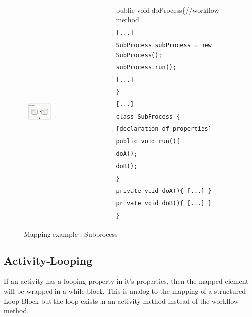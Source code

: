 \begin{figure}[h]
\centering
\begin{tabularx}{\linewidth}{lcX}
	\multirow{16}{*}{\includegraphics[width=0.35\textwidth]{images/mapping/subprocess.png}} &  &public void doProcess\{//workflow-method\\
	& & \texttt{\hspace{10pt}[...]}\\
	& & \texttt{\hspace{10pt}SubProcess subProcess = new SubProcess();}\\
	& & \texttt{\hspace{10pt}subProcess.run();}\\
	& & \texttt{\hspace{10pt}[...]}\\
	& & \texttt{\}}\\
	& & \texttt{[...]}\\
	& \textbf{\textcolor{blue}{=}} & \texttt{class SubProcess \{}\\
	& & \texttt{\hspace{10pt}[declaration of properties]}\\
	& & \texttt{\hspace{10pt}public void run()\{}\\
	& & \texttt{\hspace{20pt}doA();}\\
	& & \texttt{\hspace{20pt}doB();}\\
	& & \texttt{\hspace{10pt}\}}\\
	& & \texttt{\hspace{10pt}private void doA()\{ [...] \}}\\
	& & \texttt{\hspace{10pt}private void doB()\{ [...] \}}\\
	& & \texttt{\}}\\
\end{tabularx}
\caption{Mapping example : Subprocess}%
\label{fig:mapping_subprocess}%
\end{figure}

\subsection{Activity-Looping}
If an activity has a looping property in it's properties, then the mapped element will be wrapped in a while-block. This is analog to the mapping of a structured Loop Block but the loop exists in an activity method instead of the workflow method.


